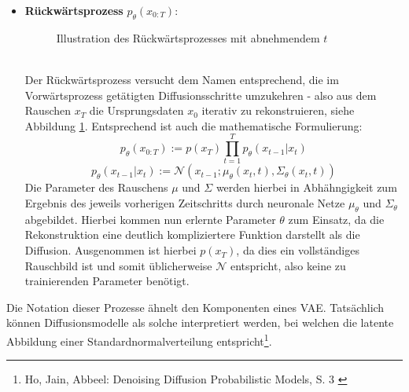 \begin{itemize}
    \item \textbf{Rückwärtsprozess} $p_\theta(x_{0:T})$: \\
    \begin{figure}[htbp]
        \centering
        \caption{Illustration des Rückwärtsprozesses mit abnehmendem $t$}
        \label{fig:reverse_process}
    \end{figure} \\
    Der Rückwärtsprozess versucht dem Namen entsprechend, die im Vorwärtsprozess getätigten Diffusionsschritte umzukehren - also aus dem Rauschen $x_T$ die Ursprungsdaten $x_0$ iterativ zu rekonstruieren, siehe Abbildung \ref{fig:reverse_process}. Entsprechend ist auch die mathematische Formulierung:
    \begin{equation}
        p_\theta(x_{0:T}) := p(x_T) \prod_{t=1}^T p_\theta(x_{t-1} | x_{t}) 
    \end{equation}
    \begin{equation}
        p_\theta(x_{t-1} | x_{t})  :=  
        \mathcal N(x_{t-1}; \mu_\theta(x_{t}, t), \Sigma_\theta(x_{t}, t))
    \end{equation}
    Die Parameter des Rauschens $\mu$ und $\Sigma$ werden hierbei in Abhähngigkeit zum Ergebnis des jeweils vorherigen Zeitschritts durch neuronale Netze $\mu_\theta$ und $\Sigma_\theta$ abgebildet. Hierbei kommen nun erlernte Parameter $\theta$ zum Einsatz, da die Rekonstruktion eine deutlich kompliziertere Funktion darstellt als die Diffusion. Ausgenommen ist hierbei $p(x_T)$, da dies ein vollständiges Rauschbild ist und somit üblicherweise $\mathcal N$ entspricht, also keine zu trainierenden Parameter benötigt.
\end{itemize}
Die Notation dieser Prozesse ähnelt den Komponenten eines \ac{VAE}. Tatsächlich können Diffusionsmodelle als solche interpretiert werden, bei welchen die latente Abbildung einer Standardnormalverteilung entspricht\footnote{
    Ho, Jain, Abbeel: Denoising Diffusion Probabilistic Models, S. 3
    \cite{ho2020denoisingdiffusionprobabilisticmodels}
}.
